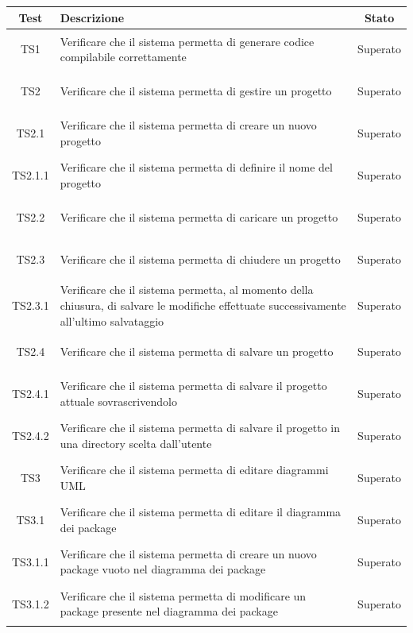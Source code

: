 \documentclass[../PianoDiQualifica.tex]{subfiles}
\begin{document}
\begin{longtable}{|c|>{\centering}p{10cm}|c|}
	\hline
	\textbf{Test} & \textbf{Descrizione} & \textbf{Stato}\\
	\hline
	\endhead
	
	\hypertarget{TS1}{TS1} & Verificare che il sistema permetta di generare codice compilabile correttamente & Superato \\
	\hline
	\hypertarget{TS2}{TS2} & Verificare che il sistema permetta di gestire un progetto & Superato \\
	\hline
	\hypertarget{TS2.1}{TS2.1} & Verificare che il sistema permetta di creare un nuovo progetto & Superato \\
	\hline
	\hypertarget{TS2.1.1}{TS2.1.1} & Verificare che il sistema permetta di definire il nome del progetto & Superato \\
	\hline
	\hypertarget{TS2.2}{TS2.2} & Verificare che il sistema permetta di caricare un progetto & Superato \\
	\hline
	\hypertarget{TS2.3}{TS2.3} & Verificare che il sistema permetta di chiudere un progetto & Superato \\
	\hline
	\hypertarget{TS2.3.1}{TS2.3.1} & Verificare che il sistema permetta, al momento della chiusura, di salvare le modifiche effettuate successivamente all'ultimo salvataggio & Superato \\
	\hline
	\hypertarget{TS2.4}{TS2.4} & Verificare che il sistema permetta di salvare un progetto & Superato \\
	\hline
	\hypertarget{TS2.4.1}{TS2.4.1} & Verificare che il sistema permetta di salvare il progetto attuale sovrascrivendolo & Superato \\
	\hline
	\hypertarget{TS2.4.2}{TS2.4.2} & Verificare che il sistema permetta di salvare il progetto in una directory scelta dall'utente & Superato \\
	\hline
	\hypertarget{TS3}{TS3} & Verificare che il sistema permetta di editare diagrammi UML & Superato \\
	\hline
	\hypertarget{TS3.1}{TS3.1} & Verificare che il sistema permetta di editare il diagramma dei package & Superato \\
	\hline
	\hypertarget{TS3.1.1}{TS3.1.1} & Verificare che il sistema permetta di creare un nuovo package vuoto nel diagramma dei package & Superato \\
	\hline
	\hypertarget{TS3.1.2}{TS3.1.2} & Verificare che il sistema permetta di modificare un package presente nel diagramma dei package & Superato\\

\end{longtable}
\end{document}
